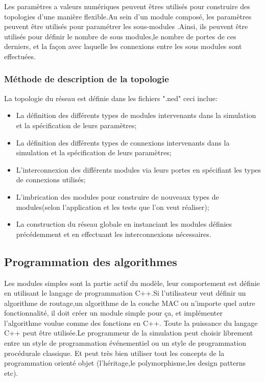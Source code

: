 Les paramètres a valeurs  numériques peuvent êtres utilisés pour construire des topologies d'une manière flexible.Au sein d'un module composé, les paramètres peuvent être utilisés pour paramétrer les sous-modules .Ainsi, ils peuvent être utilisés pour définir le nombre de sous modules,le nombre de portes de ces derniers, et la façon avec laquelle les connexions entre les sous modules sont effectuées.

\subsubsection{Méthode de description de la topologie}
La topologie du réseau est définie dans les fichiers ".ned" ceci inclue:
\begin{itemize}
\item La définition des différents types de modules intervenants dans la simulation et la spécification de leurs paramètres;
\item La définition des différents types de connexions intervenants dans la simulation et la spécification de leurs paramètres;
\item L'interconnexion des différents modules via leurs portes en spécifiant les types de connexions utilisés;
\item L'imbrication des modules pour construire de nouveaux types de modules(selon l'application et les tests que l'on veut réaliser);
\item La construction du réseau globale en instanciant les modules définies précédemment et en effectuant les interconnexions nécessaires.  
\end{itemize}

\subsection{Programmation des algorithmes}

Les modules simples sont la partie actif du modèle, leur comportement est définie en utilisant le langage de programmation C++.Si l'utilisateur veut définir un algorithme de routage,un algorithme de la couche MAC ou n'importe quel autre fonctionnalité, il doit créer un module simple pour ça, et implémenter l'algorithme voulue comme des fonctions en C++.
Toute la puissance du langage C++ peut être utilisée.Le programmeur de la simulation peut choisir librement entre un style de programmation événementiel ou un style de programmation procédurale classique. Et peut très bien utiliser tout les concepts de la programmation orienté objet (l'héritage,le polymorphisme,les design patterns etc).

